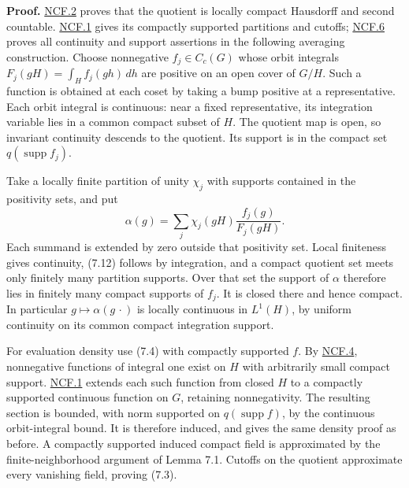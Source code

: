 \documentclass[
  11pt,
]{article}
\begin{document}
\textbf{Proof.}
\href{supporting/noncompact-foundations/noncompact-foundations.html\#ncf-002}{NCF.2}
proves that the quotient is locally compact Hausdorff and second
countable.
\href{supporting/noncompact-foundations/noncompact-foundations.html\#ncf-001}{NCF.1}
gives its compactly supported partitions and cutoffs;
\href{supporting/noncompact-foundations/noncompact-foundations.html\#ncf-006}{NCF.6}
proves all continuity and support assertions in the following averaging
construction. Choose nonnegative \(f_j\in C_c(G)\) whose orbit integrals
\(F_j(gH)=\int_H f_j(gh)\,dh\) are positive on an open cover of \(G/H\).
Such a function is obtained at each coset by taking a bump positive at a
representative. Each orbit integral is continuous: near a fixed
representative, its integration variable lies in a common compact subset
of \(H\). The quotient map is open, so invariant continuity descends to
the quotient. Its support is in the compact set
\(q(\operatorname{supp}f_j)\).

Take a locally finite partition of unity \(\chi_j\) with supports
contained in the positivity sets, and put \[
\alpha(g)=\sum_j
 \chi_j(gH)\frac{f_j(g)}{F_j(gH)}.
\tag{7.13}
\] Each summand is extended by zero outside that positivity set. Local
finiteness gives continuity, (7.12) follows by integration, and a
compact quotient set meets only finitely many partition supports. Over
that set the support of \(\alpha\) therefore lies in finitely many
compact supports of \(f_j\). It is closed there and hence compact. In
particular \(g\mapsto\alpha(g\,\cdot)\) is locally continuous in
\(L^1(H)\), by uniform continuity on its common compact integration
support.

For evaluation density use (7.4) with compactly supported \(f\). By
\href{supporting/noncompact-foundations/noncompact-foundations.html\#ncf-004}{NCF.4},
nonnegative functions of integral one exist on \(H\) with arbitrarily
small compact support.
\href{supporting/noncompact-foundations/noncompact-foundations.html\#ncf-001}{NCF.1}
extends each such function from closed \(H\) to a compactly supported
continuous function on \(G\), retaining nonnegativity. The resulting
section is bounded, with norm supported on \(q(\operatorname{supp}f)\),
by the continuous orbit-integral bound. It is therefore induced, and
gives the same density proof as before. A compactly supported induced
compact field is approximated by the finite-neighborhood argument of
Lemma 7.1. Cutoffs on the quotient approximate every vanishing field,
proving (7.3).
\end{document}
